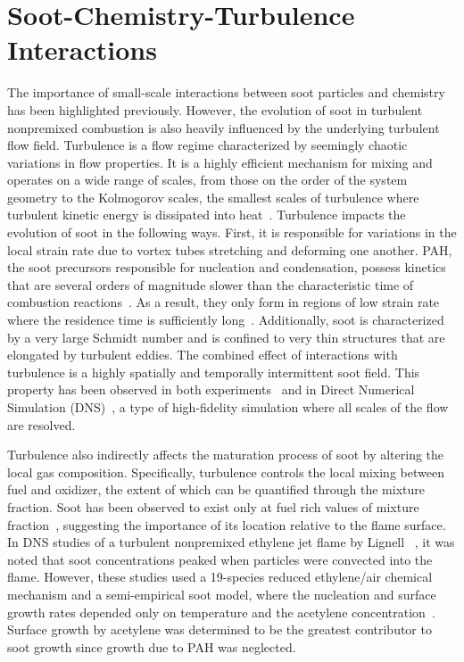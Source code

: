 \section{Soot-Chemistry-Turbulence Interactions}
\label{sec:intro:scti}

The importance of small-scale interactions between soot particles and chemistry has been highlighted previously. However, the evolution of soot in turbulent nonpremixed combustion is also heavily influenced by the underlying turbulent flow field. Turbulence is a flow regime characterized by seemingly chaotic variations in flow properties. It is a highly efficient mechanism for mixing and operates on a wide range of scales, from those on the order of the system geometry to the Kolmogorov scales, the smallest scales of turbulence where turbulent kinetic energy is dissipated into heat~\cite{pope2000}. Turbulence impacts the evolution of soot in the following ways. First, it is responsible for variations in the local strain rate due to vortex tubes stretching and deforming one another. PAH, the soot precursors responsible for nucleation and condensation, possess kinetics that are several orders of magnitude slower than the characteristic time of combustion reactions~\cite{cuoci2009}. As a result, they only form in regions of low strain rate where the residence time is sufficiently long~\cite{bisetti2012,attili2014,attili2015}. Additionally, soot is characterized by a very large Schmidt number and is confined to very thin structures that are elongated by turbulent eddies. The combined effect of interactions with turbulence is a highly spatially and temporally intermittent soot field. This property has been observed in both experiments~\cite{lee2009,qamar2009,narayanaswamy2013,mahmoud2015} and in Direct Numerical Simulation (DNS)~\cite{lignell2007,lignell2008,bisetti2012,attili2014,attili2015}, a type of high-fidelity simulation where all scales of the flow are resolved.

Turbulence also indirectly affects the maturation process of soot by altering the local gas composition. Specifically, turbulence controls the local mixing between fuel and oxidizer, the extent of which can be quantified through the mixture fraction. Soot has been observed to exist only at fuel rich values of mixture fraction~\cite{bisetti2012,attili2014,mahmoud2015,park2017}, suggesting the importance of its location relative to the flame surface. In DNS studies of a turbulent nonpremixed ethylene jet flame by Lignell \etal~\cite{lignell2007,lignell2008}, it was noted that soot concentrations peaked when particles were convected into the flame. However, these studies used a 19-species reduced ethylene/air chemical mechanism and a semi-empirical soot model, where the nucleation and surface growth rates depended only on temperature and the acetylene concentration~\cite{leung1991}. Surface growth by acetylene was determined to be the greatest contributor to soot growth since growth due to PAH was neglected.

